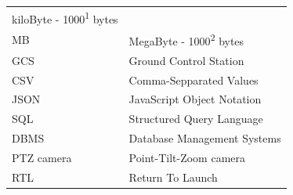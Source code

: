 \documentclass[12pt,oneside]{reedthesis}
\theoremstyle{definition}
\theoremstyle{definition}
\theoremstyle{definition}
\theoremstyle{remark}
\begin{document}
\begin{abbrvs}
\begin{longtable}[]{@{}ll@{}}
\begin{minipage}[t]{0.41\columnwidth}
    kiloByte - 1000\textsuperscript{1} bytes\strut
    \end{minipage}\tabularnewline
    \begin{minipage}[t]{0.26\columnwidth}\raggedright\strut
    MB\strut
    \end{minipage} & \begin{minipage}[t]{0.41\columnwidth}\raggedright\strut
    MegaByte - 1000\textsuperscript{2} bytes\strut
    \end{minipage}\tabularnewline
    \begin{minipage}[t]{0.26\columnwidth}\raggedright\strut
    GCS\strut
    \end{minipage} & \begin{minipage}[t]{0.41\columnwidth}\raggedright\strut
    Ground Control Station\strut
    \end{minipage}\tabularnewline
    \begin{minipage}[t]{0.26\columnwidth}\raggedright\strut
    CSV\strut
    \end{minipage} & \begin{minipage}[t]{0.41\columnwidth}\raggedright\strut
    Comma-Sepparated Values\strut
    \end{minipage}\tabularnewline
    \begin{minipage}[t]{0.26\columnwidth}\raggedright\strut
    JSON\strut
    \end{minipage} & \begin{minipage}[t]{0.41\columnwidth}\raggedright\strut
    JavaScript Object Notation\strut
    \end{minipage}\tabularnewline
    \begin{minipage}[t]{0.26\columnwidth}\raggedright\strut
    SQL\strut
    \end{minipage} & \begin{minipage}[t]{0.41\columnwidth}\raggedright\strut
    Structured Query Language\strut
    \end{minipage}\tabularnewline
    \begin{minipage}[t]{0.26\columnwidth}\raggedright\strut
    DBMS\strut
    \end{minipage} & \begin{minipage}[t]{0.41\columnwidth}\raggedright\strut
    Database Management Systems\strut
    \end{minipage}\tabularnewline
    \begin{minipage}[t]{0.26\columnwidth}\raggedright\strut
    PTZ camera\strut
    \end{minipage} & \begin{minipage}[t]{0.41\columnwidth}\raggedright\strut
    Point-Tilt-Zoom camera\strut
    \end{minipage}\tabularnewline
    \begin{minipage}[t]{0.26\columnwidth}\raggedright\strut
    RTL\strut
    \end{minipage} & \begin{minipage}[t]{0.41\columnwidth}\raggedright\strut
    Return To Launch\strut
    \end{minipage}\tabularnewline
    \bottomrule
    \end{longtable}
  \end{abbrvs}
\end{document}
